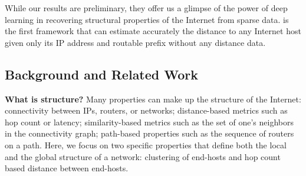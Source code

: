 
While our results are preliminary, they offer us a glimpse of the power of deep learning in recovering structural properties of the Internet from sparse data. \system{} is the first framework that can estimate accurately the distance to any Internet host given only its IP address and routable prefix without any distance data.



\subsection{Background and Related Work}
\label{dip:background}

\textbf{What is structure?} Many properties can make up the structure of the Internet: connectivity between IPs, routers, or networks; distance-based metrics such as hop count or latency; similarity-based metrics such as the set of one's neighbors in the connectivity graph; path-based properties such as the sequence of routers on a path. Here, we focus on two specific properties that define both the local and the global structure of a network: clustering of end-hosts and hop count based distance between end-hosts. %

